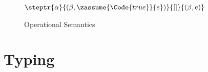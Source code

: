 \begin{figure}[h!]
{{    $\steptr{\alpha}{(\buf, \zassume{\Code{true}}{e})}{[]}{(\buf, e)}$
    }
  }
  \caption{Operational Semantics}
  \label{fig:semantics}
\end{figure}

\section{Typing}

